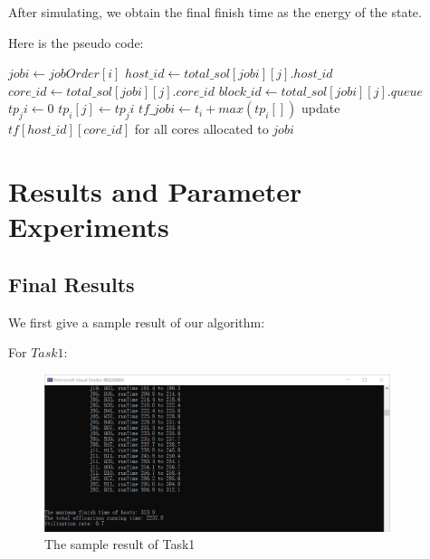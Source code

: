 \documentclass{llncs}
\begin{document}
	After simulating, we obtain the final finish time as the energy of the state. 
	
	Here is the pseudo code: \\
	\begin{algorithm}[H]
		\BlankLine
		\caption{$finishTime()$} \label{Alg-finishtime}
		{
			$jobi \gets jobOrder[i]$\;
			{
				$host\_id \gets total\_sol[jobi][j].host\_id$\;
				$core\_id \gets total\_sol[jobi][j].core\_id$\;
				$block\_id \gets total\_sol[jobi][j].queue$\;
				$tp_ji \gets 0$\;
				{
				}
				$tp_i[j] \gets tp_ji$\;
			}
			$tf\_jobi \gets t_i + max(tp_i[])$\;
			update $tf[host\_id][core\_id]$ for all cores allocated to $jobi$\;
		}
		\;
	\end{algorithm}
	
	\section{Results and Parameter Experiments} \label{sec-experiment}
	\subsection{Final Results} \label{subsec-res}
	We first give a sample result of our algorithm: 
	
	For $Task 1$: 
	\begin{figure}[H]
		\begin{center}
			\includegraphics[width=0.9\textwidth]{Fig-task1-res-new.png}
			\caption{The sample result of Task1}
			\label{Fig-task1-res}
		\end{center}
	\end{figure}
	
\end{document}
